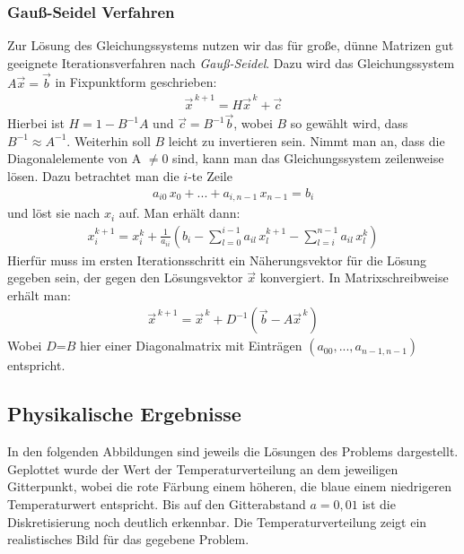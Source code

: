 \documentclass[10pt,a4paper]{article}
\begin{document}
\subsubsection{Gauß-Seidel Verfahren}
\label{sec:gauss-seidel}
Zur Lösung des Gleichungssystems nutzen wir das für große, dünne Matrizen gut geeignete Iterationsverfahren nach \emph{Gauß-Seidel}. Dazu wird das Gleichungssystem $A\vec{x}=\vec{b}$ in Fixpunktform geschrieben:
\begin{align}
\vec{x}^{\,k+1}=H\vec{x}^{\,k}+\vec{c}
\end{align}
Hierbei ist $H=1-B^{-1}A$ und $\vec{c}=B^{-1}\vec{b}$, wobei $B$ so gewählt wird, dass $B^{-1}\approx A^{-1}$. Weiterhin soll $B$ leicht zu invertieren sein. Nimmt man an, dass die Diagonalelemente von A $\not=0$ sind, kann man das Gleichungssystem zeilenweise lösen. Dazu betrachtet man die $i$-te Zeile
\begin{align}
a_{i0}\,x_0+...+a_{i,n-1}\,x_{n-1}=b_i
\end{align}
und löst sie nach $x_i$ auf. Man erhält dann:
\begin{align}
x_i^{k+1}=x^k_i+\frac{1}{a_{ii}}\left( b_i-\sum_{l=0}^{i-1}a_{il}\,x_l^{k+1} - \sum_{l=i}^{n-1}a_{il}\,x_l^k\right)
\end{align}
Hierfür muss im ersten Iterationsschritt ein Näherungsvektor für die Lösung gegeben sein, der gegen den Lösungsvektor $\vec{x}$ konvergiert. In Matrixschreibweise erhält man:
\begin{align}
\vec{x}^{\,k+1}=\vec{x}^{\,k}+D^{-1}\left(\vec{b}-A\vec{x}^{\,k}\right)
\end{align}
Wobei $D$=$B$ hier einer Diagonalmatrix mit Einträgen $(a_{00}, ... ,a_{n-1,n-1})$ entspricht.

\subsection{Physikalische Ergebnisse}
In den folgenden Abbildungen sind jeweils die Lösungen des Problems dargestellt. Geplottet wurde der Wert der Temperaturverteilung an dem jeweiligen Gitterpunkt, wobei die rote Färbung einem höheren, die blaue einem niedrigeren Temperaturwert entspricht. Bis auf den Gitterabstand $a=0,01$ ist die Diskretisierung noch deutlich erkennbar.
Die Temperaturverteilung zeigt ein realistisches Bild für das gegebene Problem.
\end{document}
